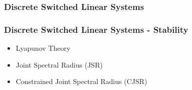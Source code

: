 \begin{frame}
    \frametitle{Discrete Switched Linear Systems}
    \begin{figure}[h]
        \centering
        \only<2>{}%
        \only<3>{}%
    \end{figure}
\end{frame}


\begin{frame}
    \frametitle{Discrete Switched Linear Systems - Stability}
    \begin{itemize}\setlength\itemsep{1em}
        \item Lyapunov Theory~\parencite{Liberzon:2003, Linsenmayer:2021, Hertneck:2021}
        \item Joint Spectral Radius (JSR)~\parencite{Maggio:2020, Ogura:2013}
        \item Constrained Joint Spectral Radius (CJSR)~\parencite{Dai:2012}
    \end{itemize}
\end{frame}


